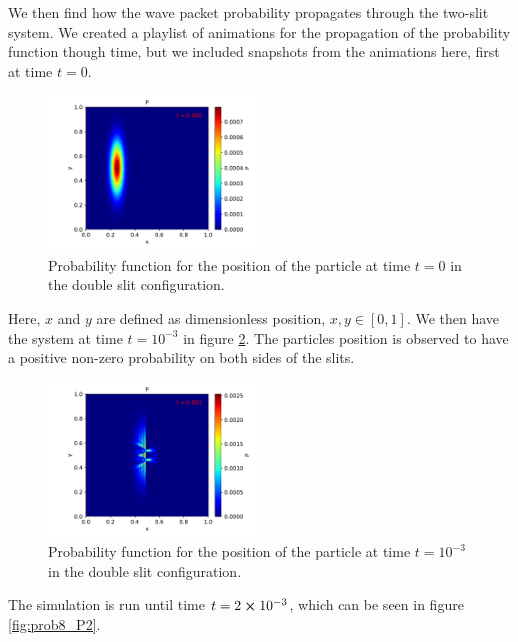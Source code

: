 \documentclass[english,notitlepage,reprint,nofootinbib]{revtex4-2}  %
\begin{document}
	\noindent
	We then find how the wave packet probability propagates through the two-slit system. We created a playlist of animations for the propagation of the probability function though time,  but we included snapshots from the animations here, first at time $t=0$.
	
	\begin{figure}[H]
		\centering
		\includegraphics[width=0.49\textwidth]{figures/problem8_P_0.000.pdf}
		\caption{Probability function for the position of the particle at time $t=0$ in the double slit configuration.}
		\label{fig:prob_P0}
	\end{figure}
	\noindent
	Here, $x$ and $y$ are defined as dimensionless position, $x, y\in[0, 1]$.
	We then have the system at time $t = 10^{-3}$ in figure \ref{fig:prob8_P1}.
	The particles position is observed to have a positive non-zero probability on
	both sides of the slits.

	\begin{figure}[H]
		\centering
		\includegraphics[width=0.49\textwidth]{figures/problem8_P_0.001.pdf}
		\caption{Probability function for the position of the particle at time $t=10^{-3}$ in the double slit configuration.}
		\label{fig:prob8_P1}
	\end{figure}
	\noindent
	The simulation is run until time $t=2\cross10^{-3}$, which can be seen in figure \ref{fig:prob8_P2}.
\end{document}
